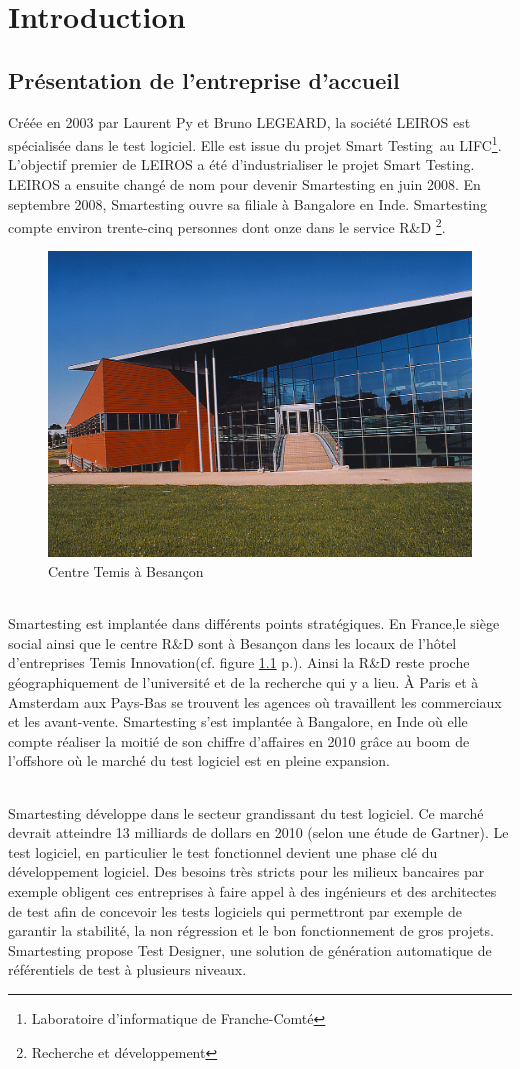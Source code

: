 \chapter{Introduction}

\section{Présentation de l'entreprise d'accueil}
Créée en 2003 par Laurent Py et Bruno LEGEARD, la société LEIROS est spécialisée dans le test logiciel. Elle est issue du projet Smart Testing\texttrademark ~au LIFC\footnote{Laboratoire d'informatique de Franche-Comté}. L'objectif premier de LEIROS a été d'industrialiser le projet Smart Testing\texttrademark.  LEIROS a ensuite changé de nom pour devenir Smartesting en juin 2008. En septembre 2008, Smartesting ouvre sa filiale à Bangalore en Inde. Smartesting compte environ trente-cinq personnes dont onze dans le service R\&D \footnote{Recherche et développement}.

\begin{figure}[!ht]
\centering
\includegraphics[width=.55\textwidth]{Illustrations/temis.jpg}
\caption{Centre Temis à Besançon}
\label{figure:temis}
\end{figure}

\subparagraph*{}
Smartesting est implantée dans différents points stratégiques. En France,le siège social ainsi que le centre R\&D sont à Besançon dans les locaux de l'hôtel d'entreprises Temis Innovation(cf. figure \ref{figure:temis} p.\pageref{figure:temis}). Ainsi la R\&D reste proche géographiquement de l'université et de la recherche qui y a lieu. À Paris et à Amsterdam aux Pays-Bas se trouvent les agences où travaillent les commerciaux et les avant-vente. Smartesting s'est implantée à Bangalore, en Inde où elle compte réaliser la moitié de son chiffre d'affaires en 2010 grâce au boom de l'offshore où le marché du test logiciel est en pleine expansion.

\subparagraph*{}
Smartesting développe dans le secteur grandissant du test logiciel. Ce marché devrait atteindre 13 milliards de dollars en 2010 (selon une étude de Gartner). Le test logiciel, en particulier le test fonctionnel devient une phase clé du développement logiciel. Des besoins très stricts pour les milieux bancaires par exemple obligent ces entreprises à faire appel à des ingénieurs et des architectes de test afin de concevoir les tests logiciels qui permettront par exemple de garantir la stabilité, la non régression et le bon fonctionnement de gros projets. Smartesting propose Test Designer, une solution de génération automatique de référentiels de test à plusieurs niveaux.

